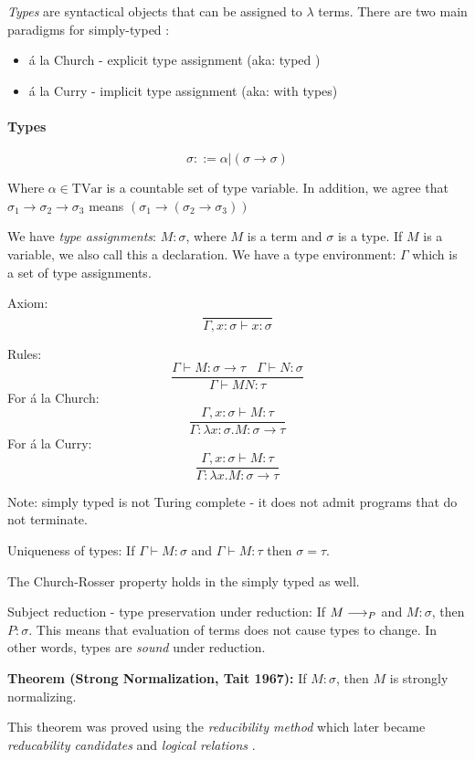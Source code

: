 \emph{Types} are syntactical objects that can be assigned to $\lambda$ terms. There are two main
paradigms for simply-typed \lc:
\begin{itemize}
	\item \'a la Church - explicit type assignment (aka: typed \lc)
	\item \'a la Curry - implicit type assignment (aka: \lc with types)
\end{itemize}

\paragraph{Types}
\[
\sigma ::= \alpha | (\sigma \to \sigma)
\]

Where $\alpha \in \mathrm{TVar}$ is a countable set of type variable. In addition, we agree
that $\sigma_1 \to \sigma_2 \to \sigma_3$ means $(\sigma_1 \to (\sigma_2 \to \sigma_3))$

We have \emph{type assignments}: $M : \sigma$, where $M$ is a \lc term and $\sigma$ is a type. If $M$ is a variable,
we also call this a declaration. We have a type environment: $\Gamma$ which is a set of type assignments.

Axiom:
\[
\frac{}{\Gamma, x : \sigma \vdash x : \sigma}
\]

Rules:
\[
\frac{\Gamma \vdash M : \sigma \to \tau~~~~\Gamma \vdash N : \sigma}{\Gamma \vdash M N : \tau}
\]
For \'a la Church:
\[
\frac{\Gamma, x: \sigma \vdash M : \tau}{\Gamma : \lambda x: \sigma. M : \sigma \to \tau}
\]
For \'a la Curry:
\[
\frac{\Gamma, x: \sigma \vdash M : \tau}{\Gamma : \lambda x. M : \sigma \to \tau}
\]

Note: simply typed \lc is not Turing complete - it does not admit programs that do not terminate.

Uniqueness of types: If $\Gamma \vdash M : \sigma$ and $\Gamma \vdash M : \tau$ then $\sigma = \tau$.

The Church-Rosser property holds in the simply typed \lc as well.

Subject reduction - type preservation under reduction: If $M \longrightarrow_ P$ and $M : \sigma$, then $P : \sigma$. 
This means that evaluation of terms does not cause types to change. In other words, types are \emph{sound}
under reduction.

\textbf{Theorem (Strong Normalization, Tait 1967):} If $M : \sigma$, then $M$ is strongly normalizing.

This theorem was proved using the \emph{reducibility method} which later became \emph{reducability candidates}
and \emph{logical relations} .

